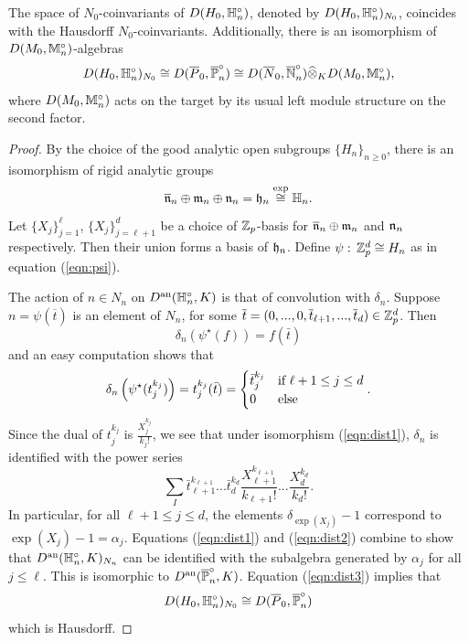 \documentclass[10pt]{amsart}
\begin{document}
\begin{lemma}\label{lem:Hd_coinv}
The space of $N_{0}$-coinvariants of $D(H_{0},\mathbb{H}^{\circ}_{n})$, denoted by $D(H_{0},\mathbb{H}^{\circ}_{n})_{N_{0}}$, coincides with the Hausdorff $N_{0}$-coinvariants. Additionally, there is an isomorphism of $D(M_{0},\mathbb{M}^{\circ}_{n})$-algebras \[
    D(H_{0},\mathbb{H}^{\circ}_{n})_{N_{0}} \cong D(\overline{P}_{0},\overline{\mathbb{P}}^{\circ}_{n})\cong D(\overline{N}_{0},\overline{\mathbb{N}}^{\circ}_{n})\widehat{\otimes}_{K} D(M_{0},\mathbb{M}^{\circ}_{n}), 
\] where $D(M_{0},\mathbb{M}^{\circ}_{n})$ acts on the target by its usual left module structure on the second factor. 
\end{lemma}
\begin{proof}
By the choice of the good analytic open subgroups $\{H_{n}\}_{n\geq 0}$, there is an isomorphism of rigid analytic groups\[
    \overline{\mathfrak{n}}_{n} \oplus\mathfrak{m}_{n}\oplus\mathfrak{n}_{n}=\mathfrak{h}_{n} \overset{\exp}{\cong} \mathbb{H}_{n}. 
\] Let $\{X_{j}\}_{j=1}^{\ell}$, $\{X_{j}\}_{j=\ell+1}^{d}$ be a choice of $\mathbb{Z}_{p}$-basis for $\overline{\mathfrak{n}}_{n} \oplus\mathfrak{m}_{n}$ and $\mathfrak{n}_{n}$ respectively. Then their union forms a basis of $\mathfrak{h}_{n}$. Define $\psi:\,\mathbb{Z}_{p}^{d} \cong H_{n}$ as in equation (\ref{eqn:psi}).


The action of $n\in N_{n}$ on $D^{\textnormal{an}}(\mathbb{H}^{\circ}_{n},K)$ is that of convolution with $\delta_{n}$. Suppose $n=\psi(\overline{t})$ is an element of $N_{n}$, for some $\overline{t}=(0,...,0,\overline{t}_{\ell+1},...,\overline{t}_{d})\in \mathbb{Z}_{p}^{d}$. Then  \[
    \delta_{n}\left(\psi^{\star}(f)\right)= f(\bar{t}) 
\] and an easy computation shows that \[
    \delta_{n}\left(\psi^{\star}(t_{j}^{k_{j}})\right)=t_{j}^{k_j}(\bar{t})=\begin{cases}
    \bar{t}^{k_j}_{j} & \textnormal{if } \ell+1\leq j\leq d\\
    0 & \textnormal{else}\\
\end{cases}.
\] Since the dual of $t_{j}^{k_{j}}$ is $\frac{X_{j}^{k_{j}}}{k_{j}!}$, we see that under isomorphism (\ref{eqn:dist1}), $\delta_{n}$ is identified with the power series \[
    \sum_{I}\bar{t}^{k_{\ell+1}}_{\ell+1}...\bar{t}^{k_d}_{d}\frac{X_{\ell+1}^{k_{\ell+1}}}{k_{\ell+1}!}...\frac{X_{d}^{k_{d}}}{k_{d}!}.
\] In particular, for all $\ell+1\leq j \leq d$, the elements $\delta_{\exp(X_{j})}-1$ correspond to $\exp(X_{j})-1=\alpha_{j}$. Equations (\ref{eqn:dist1}) and (\ref{eqn:dist2}) combine to show that $D^{\textnormal{an}}(\mathbb{H}_{n}^{\circ},K)_{N_{n}}$ can be identified with the subalgebra generated by $\alpha_{j}$ for all $j\leq\ell$. This is isomorphic to $D^{\textnormal{an}}(\overline{\mathbb{P}}_{n}^{\circ},K)$. Equation (\ref{eqn:dist3}) implies that \begin{equation*}
        D(H_{0},\mathbb{H}^{\circ}_{n})_{N_{0}} \cong D(\overline{P}_{0},\overline{\mathbb{P}}^{\circ}_{n}) 
\end{equation*} which is Hausdorff. 


\end{proof}
\end{document}
